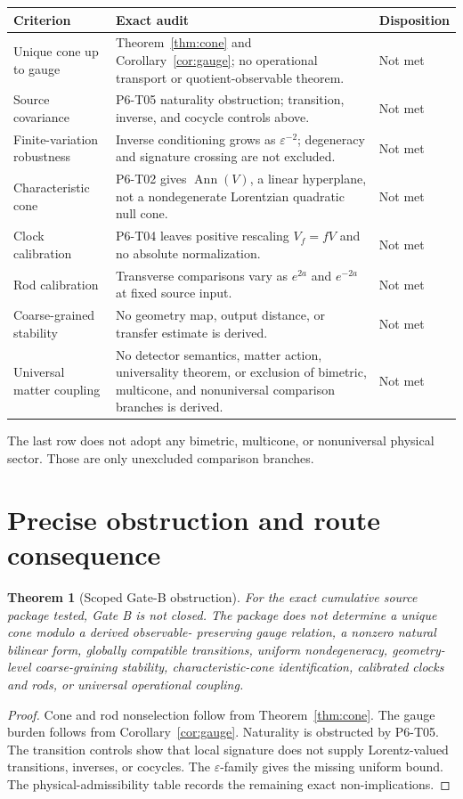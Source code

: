 \documentclass[11pt]{article}
\newtheorem{theorem}{Theorem}
\newcommand{\Ann}{\operatorname{Ann}}
\begin{document}
\begin{longtable}{>{\raggedright\arraybackslash}p{}
                  >{\raggedright\arraybackslash}p{}
                  >{\raggedright\arraybackslash}p{}}
\toprule
Criterion & Exact audit & Disposition\\
\midrule
\endhead
Unique cone up to gauge & Theorem~\ref{thm:cone} and
Corollary~\ref{cor:gauge}; no operational transport or quotient-observable
theorem. & Not met\\
Source covariance & P6-T05 naturality obstruction; transition, inverse, and
cocycle controls above. & Not met\\
Finite-variation robustness & Inverse conditioning grows as
\(\varepsilon^{-2}\); degeneracy and signature crossing are not excluded. &
Not met\\
Characteristic cone & P6-T02 gives \(\Ann(V)\), a linear hyperplane, not a
nondegenerate Lorentzian quadratic null cone. & Not met\\
Clock calibration & P6-T04 leaves positive rescaling \(V_f=fV\) and no
absolute normalization. & Not met\\
Rod calibration & Transverse comparisons vary as \(e^{2a}\) and \(e^{-2a}\)
at fixed source input. & Not met\\
Coarse-grained stability & No geometry map, output distance, or transfer
estimate is derived. & Not met\\
Universal matter coupling & No detector semantics, matter action,
universality theorem, or exclusion of bimetric, multicone, and nonuniversal
comparison branches is derived. & Not met\\
\bottomrule
\end{longtable}

The last row does not adopt any bimetric, multicone, or nonuniversal physical
sector. Those are only unexcluded comparison branches.

\section{Precise obstruction and route consequence}

\begin{theorem}[Scoped Gate-B obstruction]
\label{thm:obstruction}
For the exact cumulative source package tested, Gate B is not closed. The
package does not determine a unique cone modulo a derived observable-
preserving gauge relation, a nonzero natural bilinear form, globally
compatible transitions, uniform nondegeneracy, geometry-level
coarse-graining stability, characteristic-cone identification, calibrated
clocks and rods, or universal operational coupling.
\end{theorem}
\begin{proof}
Cone and rod nonselection follow from Theorem~\ref{thm:cone}. The gauge burden
follows from Corollary~\ref{cor:gauge}. Naturality is obstructed by P6-T05.
The transition controls show that local signature does not supply
Lorentz-valued transitions, inverses, or cocycles. The
\(\varepsilon\)-family gives the missing uniform bound. The
physical-admissibility table records the remaining exact non-implications.
\end{proof}
\end{document}
